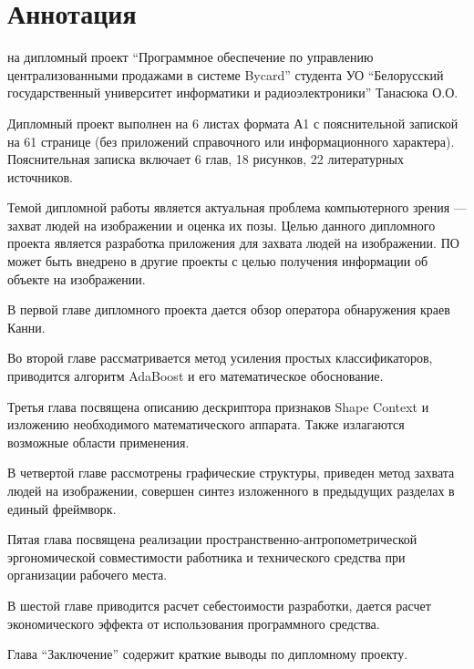 \section*{Аннотация}
\thispagestyle{empty}

\begin{center}
  \begin{minipage}{0.8\textwidth}
    на дипломный проект ``Программное обеспечение по управлению централизованными продажами в системе Bycard'' студента УО ``Белорусский государственный университет информатики и радиоэлектроники'' Танасюка О.О.
  \end{minipage}
\end{center}

Дипломный проект выполнен на 6 листах формата А1 с пояснительной запиской на 61 странице (без приложений справочного или информационного характера). Пояснительная записка включает 6 глав, 18 рисунков, 22 литературных источников.

Темой дипломной работы является актуальная проблема компьютерного зрения --- захват людей на изображении и оценка их позы. Целью данного дипломного проекта является разработка приложения для захвата людей на изображении. ПО может быть внедрено в другие проекты с целью получения информации об объекте на изображении.

В первой главе дипломного проекта дается обзор оператора обнаружения краев Канни.

Во второй главе рассматривается метод усиления простых классификаторов, приводится алгоритм AdaBoost и его математическое обоснование.

Третья глава посвящена описанию дескриптора признаков Shape Context и изложению необходимого математического аппарата. Также излагаются возможные области применения.

В четвертой главе рассмотрены графические структуры, приведен метод захвата людей на изображении, совершен синтез изложенного в предыдущих разделах в единый фреймворк.

Пятая глава посвящена реализации пространственно\hyp{}антропометрической эргономической совместимости работника и технического средства при организации рабочего места.

В шестой главе приводится расчет себестоимости разработки, дается расчет экономического эффекта от использования программного средства. 

Глава ``Заключение'' содержит краткие выводы по дипломному проекту.

\newpage
